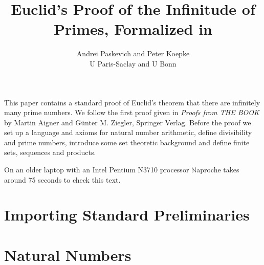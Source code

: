 \documentclass[11pt]{article}
\author{Andrei Paskevich and Peter Koepke\\
   U Paris-Saclay and U Bonn}
\title{Euclid's Proof 
of the Infinitude of Primes, Formalized in \Naproche{}}
\begin{document}
\newcommand{\val}[2]{#1_{#2}}
\newcommand{\Prod}[3]{#1_{#2} \cdots #1_{#3}}
\newcommand{\Seq}[2]{\{#1,\dots,#2\}}
\newcommand{\FinSet}[3]{\{#1_{#2},\dots,#1_{#3}\}}
\newcommand{\Primes}{\mathbb{P}}
\newcommand{\Naproche}{$\mathbb{N}$aproche}

\maketitle

This paper contains a standard proof of Euclid's theorem 
that there are infinitely many prime numbers. We
follow the first proof given in \emph{Proofs from THE BOOK}
by Martin Aigner and Günter M. Ziegler, Springer Verlag.
Before the proof we 
set up a language and axioms for natural number arithmetic,
define divisibility and prime numbers,
introduce some set theoretic background and define
finite sets, sequences and products.

On an older laptop 
with an Intel Pentium N3710 processor \Naproche{} takes 
around 75 seconds to check this text.


\section{Importing Standard Preliminaries}

\begin{forthel}
\end{forthel}


\section{Natural Numbers}
 
\end{document}
